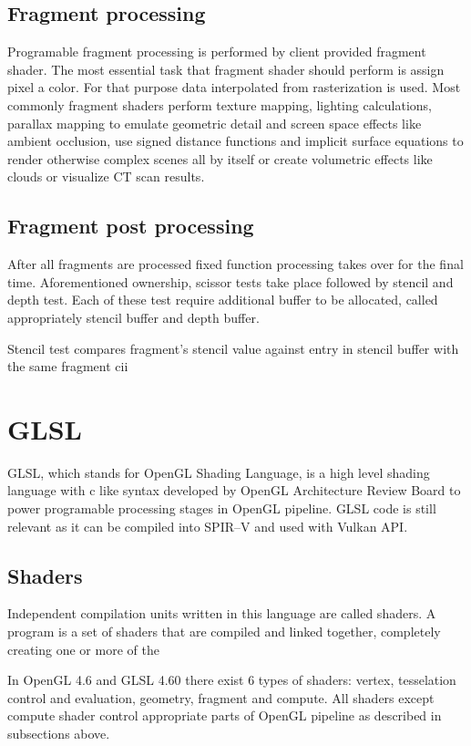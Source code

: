 \subsection{Fragment processing}

Programable fragment processing is performed by client provided fragment shader. The most essential task that fragment shader should perform is assign pixel a color.
For that purpose data interpolated from rasterization is used. 
Most commonly fragment shaders perform texture mapping, lighting calculations, parallax mapping to emulate geometric detail and screen space effects like ambient occlusion, 
use signed distance functions and implicit surface equations to render otherwise complex scenes all by itself or create volumetric effects like clouds or visualize CT scan results.

\subsection{Fragment post processing}

After all fragments are processed fixed function processing takes over for the final time.
Aforementioned ownership, scissor tests take place followed by stencil and depth test.
Each of these test require additional buffer to be allocated, called appropriately stencil buffer and depth buffer.

Stencil test compares fragment's stencil value against entry in stencil buffer with the same fragment cii

\section{GLSL}

GLSL, which stands for OpenGL Shading Language, is a high level shading language with c like syntax developed by OpenGL Architecture Review Board to power programable processing stages in OpenGL pipeline. 
GLSL code is still relevant as it can be compiled into SPIR--V and used with Vulkan API.

\subsection*{Shaders}

Independent compilation units written in this language are called shaders. A program is a set of
shaders that are compiled and linked together, completely creating one or more of the

In OpenGL 4.6 and GLSL 4.60 there exist 6 types of shaders: vertex, tesselation control and evaluation, geometry, fragment and compute.
All shaders except compute shader control appropriate parts of OpenGL pipeline as described in subsections above. 

